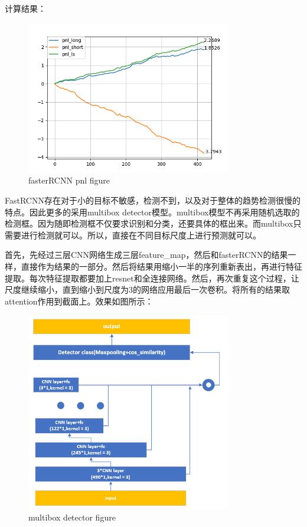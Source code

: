 \documentclass[11pt]{ctexart}
\begin{document}
计算结果：
\begin{figure}[H]
\begin{center}
\includegraphics[width=0.8\textwidth]{plt1.PNG}
\end{center}
\caption{fasterRCNN pnl figure}
\label{FIG.12}
\end{figure}
FastRCNN存在对于小的目标不敏感，检测不到，以及对于整体的趋势检测很慢的特点。因此更多的采用multibox detector模型。multibox模型不再采用随机选取的检测框。因为随即检测框不仅要求识别和分类，还要具体的框出来。而multibox只需要进行检测就可以。所以，直接在不同目标尺度上进行预测就可以。

首先，先经过三层CNN网络生成三层feature\_map，然后和fasterRCNN的结果一样，直接作为结果的一部分。然后将结果用缩小一半的序列重新表出，再进行特征提取。每次特征提取都要加上resnet和全连接网络。然后，再次重复这个过程，让尺度继续缩小，直到缩小到尺度为3的网络应用最后一次卷积。将所有的结果取attention作用到截面上。效果如图所示：
\begin{figure}[H]
\begin{center}
\includegraphics[width=0.8\textwidth]{str7.PNG}
\end{center}
\caption{multibox detector figure}
\label{FIG.13}
\end{figure}
\end{document}
